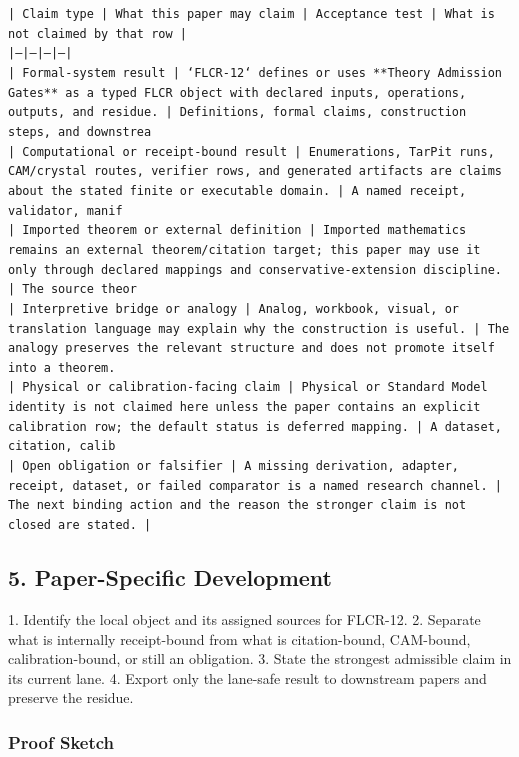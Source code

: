 \documentclass[11pt]{article}
\begin{document}
\noindent\texttt{| Claim type | What this paper may claim | Acceptance test | What is not claimed by that row |}\\
\noindent\texttt{|---|---|---|---|}\\
\noindent\texttt{| Formal-system result | `FLCR-12` defines or uses **Theory Admission Gates** as a typed FLCR object with declared inputs, operations, outputs, and residue. | Definitions, formal claims, construction steps, and downstrea}\\
\noindent\texttt{| Computational or receipt-bound result | Enumerations, TarPit runs, CAM/crystal routes, verifier rows, and generated artifacts are claims about the stated finite or executable domain. | A named receipt, validator, manif}\\
\noindent\texttt{| Imported theorem or external definition | Imported mathematics remains an external theorem/citation target; this paper may use it only through declared mappings and conservative-extension discipline. | The source theor}\\
\noindent\texttt{| Interpretive bridge or analogy | Analog, workbook, visual, or translation language may explain why the construction is useful. | The analogy preserves the relevant structure and does not promote itself into a theorem. }\\
\noindent\texttt{| Physical or calibration-facing claim | Physical or Standard Model identity is not claimed here unless the paper contains an explicit calibration row; the default status is deferred mapping. | A dataset, citation, calib}\\
\noindent\texttt{| Open obligation or falsifier | A missing derivation, adapter, receipt, dataset, or failed comparator is a named research channel. | The next binding action and the reason the stronger claim is not closed are stated. | }\\

\subsection*{5. Paper-Specific Development}

1. Identify the local object and its assigned sources for FLCR-12.
2. Separate what is internally receipt-bound from what is citation-bound, CAM-bound, calibration-bound, or still an obligation.
3. State the strongest admissible claim in its current lane.
4. Export only the lane-safe result to downstream papers and preserve the residue.

\subsubsection*{Proof Sketch}
\end{document}
